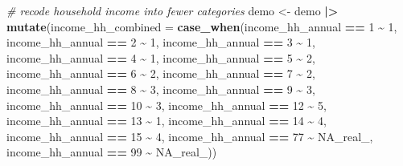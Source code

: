 \documentclass[
]{article}
\newenvironment{Shaded}{\begin{snugshade}}{\end{snugshade}}
\newcommand{\AttributeTok}[1]{\textcolor[rgb]{0.13,0.29,0.53}{#1}}
\newcommand{\CommentTok}[1]{\textcolor[rgb]{0.56,0.35,0.01}{\textit{#1}}}
\newcommand{\ConstantTok}[1]{\textcolor[rgb]{0.56,0.35,0.01}{#1}}
\newcommand{\DecValTok}[1]{\textcolor[rgb]{0.00,0.00,0.81}{#1}}
\newcommand{\FunctionTok}[1]{\textcolor[rgb]{0.13,0.29,0.53}{\textbf{#1}}}
\newcommand{\NormalTok}[1]{#1}
\newcommand{\OtherTok}[1]{\textcolor[rgb]{0.56,0.35,0.01}{#1}}
\newcommand{\SpecialCharTok}[1]{\textcolor[rgb]{0.81,0.36,0.00}{\textbf{#1}}}
\begin{document}
\begin{Shaded}
\begin{Highlighting}[]
\CommentTok{\# recode household income into fewer categories }
\NormalTok{demo }\OtherTok{\textless{}{-}}\NormalTok{ demo }\SpecialCharTok{|\textgreater{}} 
  \FunctionTok{mutate}\NormalTok{(}\AttributeTok{income\_hh\_combined =} \FunctionTok{case\_when}\NormalTok{(income\_hh\_annual }\SpecialCharTok{==} \DecValTok{1} \SpecialCharTok{\textasciitilde{}} \DecValTok{1}\NormalTok{,}
\NormalTok{                                      income\_hh\_annual }\SpecialCharTok{==} \DecValTok{2} \SpecialCharTok{\textasciitilde{}} \DecValTok{1}\NormalTok{,}
\NormalTok{                                      income\_hh\_annual }\SpecialCharTok{==} \DecValTok{3} \SpecialCharTok{\textasciitilde{}} \DecValTok{1}\NormalTok{,}
\NormalTok{                                      income\_hh\_annual }\SpecialCharTok{==} \DecValTok{4} \SpecialCharTok{\textasciitilde{}} \DecValTok{1}\NormalTok{,}
\NormalTok{                                      income\_hh\_annual }\SpecialCharTok{==} \DecValTok{5} \SpecialCharTok{\textasciitilde{}} \DecValTok{2}\NormalTok{,}
\NormalTok{                                      income\_hh\_annual }\SpecialCharTok{==} \DecValTok{6} \SpecialCharTok{\textasciitilde{}} \DecValTok{2}\NormalTok{,}
\NormalTok{                                      income\_hh\_annual }\SpecialCharTok{==} \DecValTok{7} \SpecialCharTok{\textasciitilde{}} \DecValTok{2}\NormalTok{,}
\NormalTok{                                      income\_hh\_annual }\SpecialCharTok{==} \DecValTok{8} \SpecialCharTok{\textasciitilde{}} \DecValTok{3}\NormalTok{,}
\NormalTok{                                      income\_hh\_annual }\SpecialCharTok{==} \DecValTok{9} \SpecialCharTok{\textasciitilde{}} \DecValTok{3}\NormalTok{,}
\NormalTok{                                      income\_hh\_annual }\SpecialCharTok{==} \DecValTok{10} \SpecialCharTok{\textasciitilde{}} \DecValTok{3}\NormalTok{,}
\NormalTok{                                      income\_hh\_annual }\SpecialCharTok{==} \DecValTok{12} \SpecialCharTok{\textasciitilde{}} \DecValTok{5}\NormalTok{,}
\NormalTok{                                      income\_hh\_annual }\SpecialCharTok{==} \DecValTok{13} \SpecialCharTok{\textasciitilde{}} \DecValTok{1}\NormalTok{,}
\NormalTok{                                      income\_hh\_annual }\SpecialCharTok{==} \DecValTok{14} \SpecialCharTok{\textasciitilde{}} \DecValTok{4}\NormalTok{,}
\NormalTok{                                      income\_hh\_annual }\SpecialCharTok{==} \DecValTok{15} \SpecialCharTok{\textasciitilde{}} \DecValTok{4}\NormalTok{,}
\NormalTok{                                      income\_hh\_annual }\SpecialCharTok{==} \DecValTok{77} \SpecialCharTok{\textasciitilde{}} \ConstantTok{NA\_real\_}\NormalTok{,}
\NormalTok{                                      income\_hh\_annual }\SpecialCharTok{==} \DecValTok{99} \SpecialCharTok{\textasciitilde{}} \ConstantTok{NA\_real\_}\NormalTok{))}


\end{Highlighting}
\end{Shaded}
\end{document}
